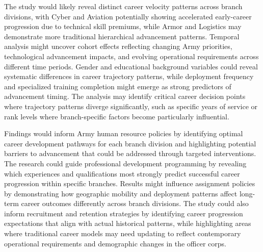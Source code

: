 \documentclass[../main.tex]{subfiles}
\begin{document}

The study would likely reveal distinct career velocity patterns across branch divisions, with Cyber and Aviation potentially showing accelerated early-career progression due to technical skill premiums, while Armor and Logistics may demonstrate more traditional hierarchical advancement patterns. Temporal analysis might uncover cohort effects reflecting changing Army priorities, technological advancement impacts, and evolving operational requirements across different time periods. Gender and educational background variables could reveal systematic differences in career trajectory patterns, while deployment frequency and specialized training completion might emerge as strong predictors of advancement timing. The analysis may identify critical career decision points where trajectory patterns diverge significantly, such as specific years of service or rank levels where branch-specific factors become particularly influential.


Findings would inform Army human resource policies by identifying optimal career development pathways for each branch division and highlighting potential barriers to advancement that could be addressed through targeted interventions. The research could guide professional development programming by revealing which experiences and qualifications most strongly predict successful career progression within specific branches. Results might influence assignment policies by demonstrating how geographic mobility and deployment patterns affect long-term career outcomes differently across branch divisions. The study could also inform recruitment and retention strategies by identifying career progression expectations that align with actual historical patterns, while highlighting areas where traditional career models may need updating to reflect contemporary operational requirements and demographic changes in the officer corps.

\end{document}
